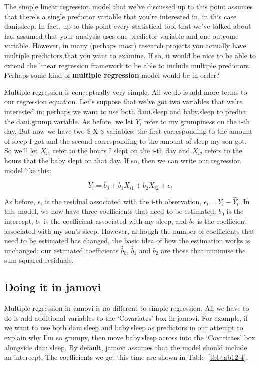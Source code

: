 \documentclass[
  a4paper,
]{book}
\begin{document}
The simple linear regression model that we've discussed up to this point
assumes that there's a single predictor variable that you're interested
in, in this case dani.sleep. In fact, up to this point every statistical
tool that we've talked about has assumed that your analysis uses one
predictor variable and one outcome variable. However, in many (perhaps
most) research projects you actually have multiple predictors that you
want to examine. If so, it would be nice to be able to extend the linear
regression framework to be able to include multiple predictors. Perhaps
some kind of \textbf{multiple regression} model would be in order?

Multiple regression is conceptually very simple. All we do is add more
terms to our regression equation. Let's suppose that we've got two
variables that we're interested in; perhaps we want to use both
dani.sleep and baby.sleep to predict the dani.grump variable. As before,
we let \(Y_{i}\) refer to my grumpiness on the i-th day. But now we have
two \$ X \$ variables: the first corresponding to the amount of sleep I
got and the second corresponding to the amount of sleep my son got. So
we'll let \(X_{i1}\) refer to the hours I slept on the i-th day and
\(X_{i2}\) refers to the hours that the baby slept on that day. If so,
then we can write our regression model like this:

\[Y_i=b_0+b_1X_{i1}+b_2X_{i2}+\epsilon_i\]

As before, \(\epsilon_i\) is the residual associated with the i-th
observation, \(\epsilon_i = Y_i - \hat{Y}_i\). In this model, we now
have three coefficients that need to be estimated: \(b_0\) is the
intercept, \(b_1\) is the coefficient associated with my sleep, and
\(b_2\) is the coefficient associated with my son's sleep. However,
although the number of coefficients that need to be estimated has
changed, the basic idea of how the estimation works is unchanged: our
estimated coefficients \(\hat{b}_0\), \(\hat{b}_1\) and \(\hat{b}_2\)
are those that minimise the sum squared residuals.

\hypertarget{doing-it-in-jamovi}{%
\subsection{Doing it in jamovi}\label{doing-it-in-jamovi}}

Multiple regression in jamovi is no different to simple regression. All
we have to do is add additional variables to the `Covariates' box in
jamovi. For example, if we want to use both dani.sleep and baby.sleep as
predictors in our attempt to explain why I'm so grumpy, then move
baby.sleep across into the `Covariates' box alongside dani.sleep. By
default, jamovi assumes that the model should include an intercept. The
coefficients we get this time are shown in Table~\ref{tbl-tab12-4}.
\end{document}
